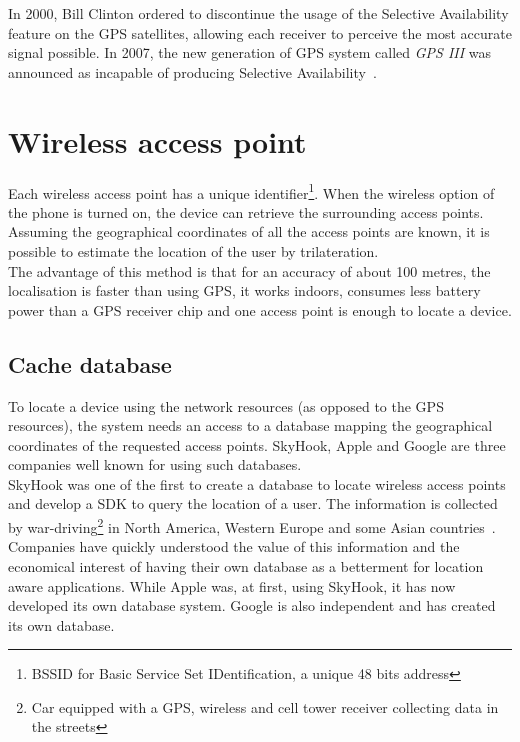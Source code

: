 In 2000, Bill Clinton ordered to discontinue the usage of the Selective Availability feature on the GPS satellites, allowing each receiver to perceive the most accurate signal possible. In 2007, the new generation of GPS system called \emph{GPS III} was announced as incapable of producing Selective Availability~\cite{gps-sa}.\\

\section{Wireless access point}
\label{sec:andro-wifi}
Each wireless access point has a unique identifier\footnote{BSSID for Basic Service Set IDentification, a unique 48 bits address}.
When the wireless option of the phone is turned on, the device can retrieve the surrounding access points.
Assuming the geographical coordinates of all the access points are known, it is possible to estimate the location of the user by trilateration.\\

The advantage of this method is that for an accuracy of about 100 metres, the localisation is faster than using GPS, it works indoors, consumes less battery power than a GPS receiver chip and one access point is enough to locate a device.\\

\subsection{Cache database}
\label{sec:andro-cell-db}

To locate a device using the network resources (as opposed to the GPS resources), the system needs an access to a database mapping the geographical coordinates of the requested access points.
SkyHook, Apple and Google are three companies well known for using such databases.\\

SkyHook was one of the first to create a database to locate wireless access points and develop a SDK to query the location of a user.
The information is collected by war-driving\footnote{Car equipped with a GPS, wireless and cell tower receiver collecting data in the streets} in North America, Western Europe and some Asian countries~\cite{skyhook-coverage}.\\

Companies have quickly understood the value of this information and the economical interest of having their own database as a betterment for location aware applications.
While Apple was, at first, using SkyHook, it has now developed its own database system.
Google is also independent and has created its own database.\\


